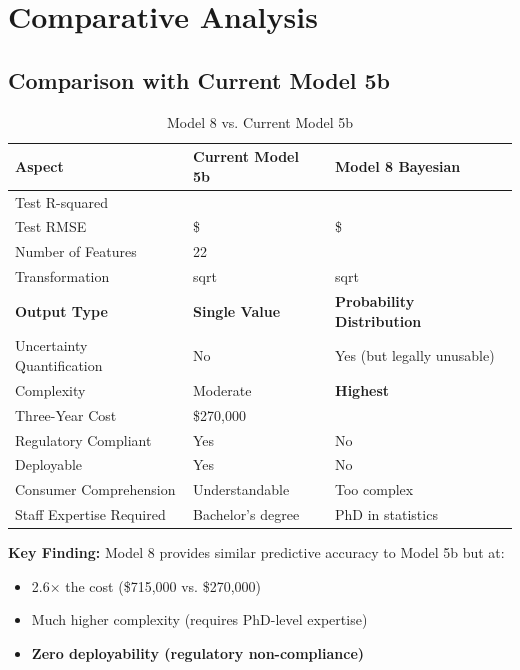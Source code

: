 
\section{Comparative Analysis}

\subsection{Comparison with Current Model 5b}

\begin{table}[h]
\centering
\caption{Model 8 vs. Current Model 5b}
\begin{tabular}{lll}
\toprule
\textbf{Aspect} & \textbf{Current Model 5b} & \textbf{Model 8 Bayesian} \\
\midrule
Test R-squared & \ModelEightRSquaredTest{} & \ModelEightRSquaredTest{} \\
Test RMSE & \$\ModelEightRMSETest{} & \$\ModelEightRMSETest{} \\
Number of Features & 22 & \ModelEightNRobustFeatures{} \\
Transformation & sqrt & sqrt \\
\textbf{Output Type} & \textbf{Single Value} & \textbf{Probability Distribution} \\
Uncertainty Quantification & No & Yes (but legally unusable) \\
Complexity & Moderate & \textbf{Highest} \\
Three-Year Cost & \$270,000 & \ModelEightThreeYearTCO{} \\
Regulatory Compliant & Yes & No \\
Deployable & Yes & No \\
Consumer Comprehension & Understandable & Too complex \\
Staff Expertise Required & Bachelor's degree & PhD in statistics \\
\bottomrule
\end{tabular}
\end{table}

\textbf{Key Finding:} Model 8 provides similar predictive accuracy to Model 5b but at:
\begin{itemize}
    \item 2.6× the cost (\$715,000 vs. \$270,000)
    \item Much higher complexity (requires PhD-level expertise)
    \item \textbf{Zero deployability (regulatory non-compliance)}
\end{itemize}

